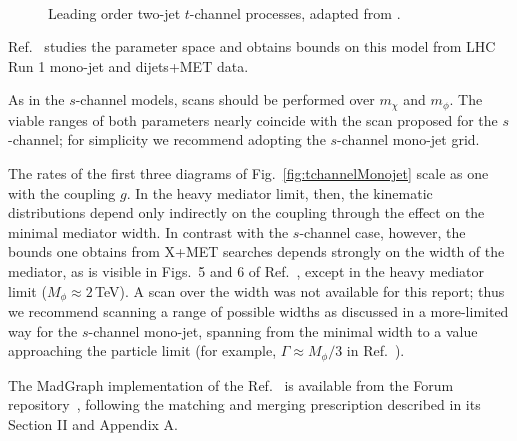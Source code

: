 \begin{figure}
\begin{feynmandiagram}[modelTDijetD]
  \end{feynmandiagram}\\\vspace{3\baselineskip}
  \begin{feynmandiagram}[modelTDijetE]
  \end{feynmandiagram}
\caption{Leading order two-jet $t$-channel processes, adapted from \cite{Papucci:2014iwa}.}\label{fig:tchannelDijet}
\end{figure}


Ref.~\cite{Papucci:2014iwa} studies the parameter space and obtains
bounds on this model from LHC Run 1 mono-jet and dijets+MET data.

As in the $s$-channel models, scans should be performed over
$m_{\chi}$ and $m_{\phi}$. The viable ranges of both parameters nearly
coincide with the scan proposed for the $s$-channel; for simplicity we
recommend adopting the $s$-channel mono-jet grid.

The rates of the first three diagrams of
Fig.~\ref{fig:tchannelMonojet} scale as one with the coupling $g$. In
the heavy mediator limit, then, the kinematic distributions depend
only indirectly on the coupling through the effect on the minimal
mediator width. In contrast with the $s$-channel case, however, the
bounds one obtains from X+MET searches depends strongly on the width
of the mediator, as is visible in Figs.~5 and 6 of
Ref.~\cite{Papucci:2014iwa}, except in the heavy mediator limit ($M_{\phi} \approx 2$\,TeV). A scan over the width was not available for this report; thus we recommend scanning a range of possible widths as discussed in a more-limited way for the $s$-channel mono-jet, spanning from the minimal width to a value approaching the particle limit (for example, $\Gamma \approx M_{\phi}/3$ in Ref.~\cite{Papucci:2014iwa}).


The MadGraph implementation of the Ref.~\cite{Papucci:2014iwa} is
available from the Forum repository~\cite{ForumSVN_TChannel}, following the
matching and merging prescription described in its Section II and
Appendix A.

